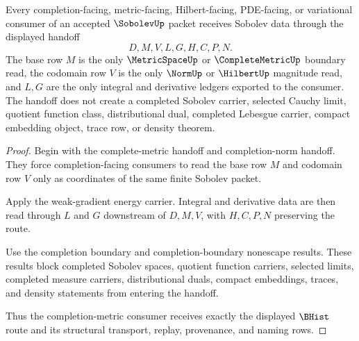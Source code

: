 \begin{theorem}
\label{thm:sobolev-completion-metric-handoff}
Every completion-facing, metric-facing, Hilbert-facing, PDE-facing, or variational consumer of an accepted $\SobolevUp$ packet receives Sobolev data through the displayed handoff
$$
D,M,V,L,G,H,C,P,N .
$$
The base row $M$ is the only $\MetricSpaceUp$ or $\CompleteMetricUp$ boundary read, the codomain row $V$ is the only $\NormUp$ or $\HilbertUp$ magnitude read, and $L,G$ are the only integral and derivative ledgers exported to the consumer. The handoff does not create a completed Sobolev carrier, selected Cauchy limit, quotient function class, distributional dual, completed Lebesgue carrier, compact embedding object, trace row, or density theorem.
\end{theorem}
\begin{proof}
Begin with the complete-metric handoff and completion-norm handoff. They force completion-facing consumers to read the base row $M$ and codomain row $V$ only as coordinates of the same finite Sobolev packet.

Apply the weak-gradient energy carrier. Integral and derivative data are then read through $L$ and $G$ downstream of $D,M,V$, with $H,C,P,N$ preserving the route.

Use the completion boundary and completion-boundary nonescape results. These results block completed Sobolev spaces, quotient function carriers, selected limits, completed measure carriers, distributional duals, compact embeddings, traces, and density statements from entering the handoff.

Thus the completion-metric consumer receives exactly the displayed $\BHist$ route and its structural transport, replay, provenance, and naming rows.
\end{proof}

